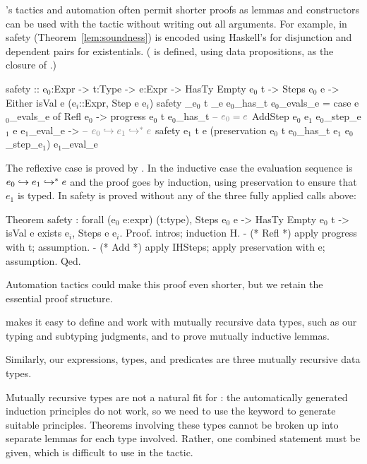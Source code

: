\coq's tactics and automation often permit shorter
proofs as lemmas and constructors can be used with the
 tactic without writing out all arguments. 
%
For example, in \lh 
safety (Theorem~\ref{lem:soundness})
is encoded using 
Haskell's 
for disjunction
and dependent pairs for existentials.
%
( is defined, using data propositions, as the 
closure of .)
%
\begin{mcode}
  safety :: e$_0$:Expr -> t:Type -> e:Expr -> HasTy Empty e$_0$ t 
         -> Steps e$_0$ e -> Either {isVal e}  (e$_i$::Expr, Step e e$_i$)
  safety _e$_0$ t _e e$_0$_has_t e$_0$_evals_e = case e$_0$_evals_e of
     Refl e$_0$ -> progress e$_0$ t e$_0$_has_t       -- $\cmt{e_0 = e}$
     AddStep e$_0$ e$_1$ e$_0$_step_e$_1$ e e$_1$_eval_e ->  -- $\cmt{e_0 \step \evalsTo{e_1}{e}}$
       safety e$_1$ t e (preservation e$_0$ t e$_0$_has_t e$_1$ e$_0$_step_e$_1$) e$_1$_eval_e
\end{mcode}
%
    The reflexive case is proved by .
    In the inductive case the evaluation
    sequence is $e_0 \hookrightarrow {e_1} \hookrightarrow^{*} {e}$
    and the proof goes by induction,
    using preservation to ensure that
    $e_1$ is typed.  
%
In \coq safety is proved 
without any of the three fully applied calls above:
%
\begin{mcode}
  Theorem safety : forall (e$_0$ e:expr) (t:type),
     Steps e$_0$ e -> HasTy Empty e$_0$ t -> isVal e \/ exists e$_i$, Steps e e$_i$.
  Proof. intros; induction H.
    - (* Refl *) apply progress with t; assumption.
    - (* Add  *) apply IHSteps; apply preservation with e; assumption. Qed.
\end{mcode}
%
Automation tactics could make this proof even shorter,
but we retain the essential proof structure.

\lh makes it easy to define and work with mutually
recursive data types, 
such as our typing and subtyping judgments,
and to prove mutually inductive lemmas.
%
\begin{fullversion}
    Similarly, our 
    expressions, types, and predicates are
    three mutually recursive data types.
\end{fullversion}
%
Mutually recursive types are not a natural fit for \coq: 
the automatically generated induction principles do not work,
so we need to use the  keyword to generate  
suitable principles.
%
Theorems involving these types cannot be
broken up into separate lemmas for each type 
involved. 
%
Rather, one combined statement must be given,
which is difficult to use %
in the  tactic.


